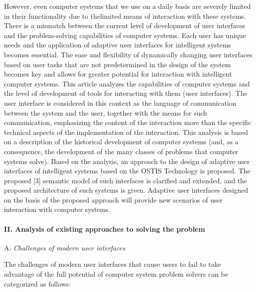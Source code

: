 \documentclass[10pt]{article}
\begin{document}
However, even computer systems that we use on a daily
basis are severely limited in their functionality due to thelimited means of interaction with these systems. There
is a mismatch between the current level of development
of user interfaces and the problem-solving capabilities of
computer systems.
Each user has unique needs and the application of
adaptive user interfaces for intelligent systems becomes
essential. The ease and flexibility of dynamically changing
user interfaces based on user tasks that are not predetermined
in the design of the system becomes key and
allows for greater potential for interaction with intelligent
computer systems.
This article analyzes the capabilities of computer systems
and the level of development of tools for interacting
with them (user interfaces).
The user interface is considered in this context as the
language of communication between the system and the
user, together with the means for such communication,
emphasizing the content of the interaction more than the
specific technical aspects of the implementation of the
interaction. This analysis is based on a description of
the historical development of computer systems (and, as
a consequence, the development of the many classes of
problems that computer systems solve).
Based on the analysis, an approach to the design of
adaptive user interfaces of intelligent systems based on
the OSTIS Technology is proposed. The proposed [3]
semantic model of such interfaces is clarified and extended,
and the proposed architecture of such systems
is given. Adaptive user interfaces designed on the basis
of the proposed approach will provide new scenarios of
user interaction with computer systems.

\begin{center}
    \paragraph{II. Analysis of existing approaches to solving the
problem}
\end{center}

 \vspace{+5mm}A. \textit{Challenges of modern user interfaces}


\vspace{+5mm}The challenges of modern user interfaces that cause
users to fail to take advantage of the full potential of
computer system problem solvers can be categorized as
follows:
\end{document}
